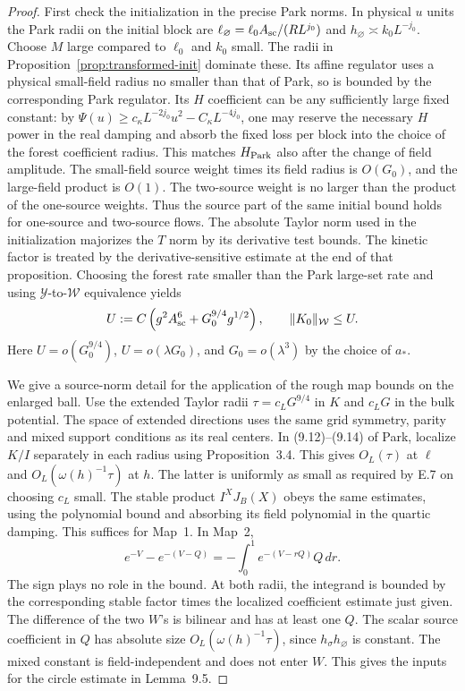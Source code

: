 \documentclass[11pt]{article}
\begin{document}
\begin{proof}
First check the initialization in the precise Park norms.
In physical \(u\) units the Park radii on the initial block
are
\(\ell_\varnothing=\ell_0A_{\rm sc}/(R L^{j_0})\)
and \(h_\varnothing\asymp k_0L^{-j_0}\).
Choose \(M\) large compared to \(\ell_0\) and \(k_0\) small.
The radii in Proposition~\ref{prop:transformed-init}
dominate these. Its affine regulator uses a physical
small-field radius no smaller than that of Park, so is
bounded by the corresponding Park regulator. Its
\(H\) coefficient can be any sufficiently large fixed
constant: by
\(\Psi(u)\ge c_\kappa L^{-2j_0}u^2-C_\kappa L^{-4j_0}\),
one may reserve the necessary \(H\) power in the real
damping and absorb the fixed loss per block into the
choice of the forest coefficient radius. This matches
\(H_{\rm Park}\) also after the change of field amplitude.
The small-field source weight times its field radius is
\(O(G_0)\), and the large-field product is \(O(1)\).
The two-source weight is no larger than the product
of the one-source weights. Thus the source part of the
same initial bound holds for one-source and two-source
flows. The absolute Taylor norm used in the initialization
majorizes the \(T\) norm by its derivative test bounds.
The kinetic factor is treated by the derivative-sensitive
estimate at the end of that proposition. Choosing the
forest rate smaller than the Park large-set rate and
using \(\mathcal Y\)-to-\(\mathcal W\) equivalence yields
\[
 U:=C\left(g^2A_{\rm sc}^6+G_0^{9/4}g^{1/2}\right),
 \qquad \|K_0\|_{\mathcal W}\le U .
\]
Here \(U=o(G_0^{9/4})\), \(U=o(\lambda G_0)\), and
\(G_0=o(\lambda^3)\) by the choice of \(a_*\).

We give a source-norm detail for the application of the
rough map bounds on the enlarged ball. Use the extended
Taylor radii \(\tau=c_LG^{9/4}\) in \(K\) and \(c_LG\)
in the bulk potential. The space of extended directions
uses the same grid symmetry, parity and mixed support
conditions as its real centers. In (9.12)--(9.14) of Park,
localize \(K/I\) separately in each radius using
Proposition~3.4. This gives \(O_L(\tau)\) at \(\ell\)
and \(O_L(\omega(h)^{-1}\tau)\) at \(h\). The latter
is uniformly as small as required by E.7 on choosing
\(c_L\) small. The stable product \(I^X J_B(X)\)
obeys the same estimates, using the polynomial bound and
absorbing its field polynomial in the quartic damping.
This suffices for Map~1. In Map~2,
\[
 e^{-V}-e^{-(V-Q)}=-\int_0^1 e^{-(V-rQ)}Q\,dr .
\]
The sign plays no role in the bound. At both radii,
the integrand is bounded by the corresponding stable
factor times the localized coefficient estimate just given.
The difference of the two \(W\)'s is bilinear and has
at least one \(Q\). The scalar source coefficient in
\(Q\) has absolute size \(O_L(\omega(h)^{-1}\tau)\),
since \(h_\sigma h_\varnothing\) is constant. The
mixed constant is field-independent and does not enter
\(W\). This gives the inputs for the circle estimate
in Lemma~9.5.


\end{proof}
\end{document}
